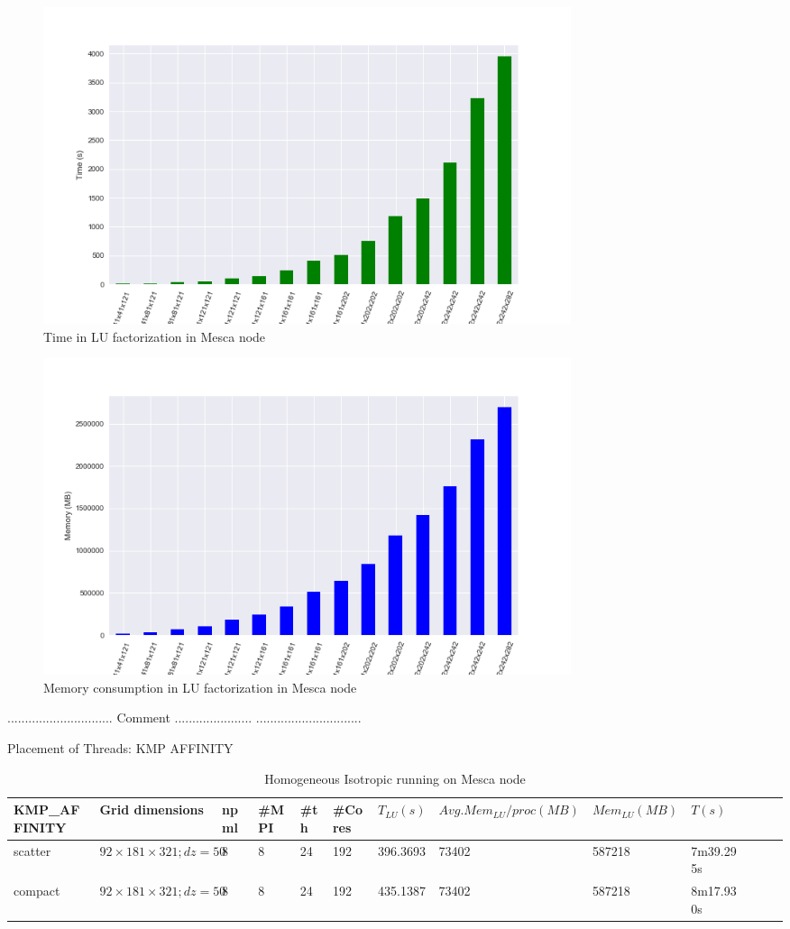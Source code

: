 \begin{figure}[]
\centering 
\includegraphics[width=0.75\textwidth]{images/Mesca_Time.png}
\caption{Time in LU factorization in Mesca node}
\label{Mesca_Time} 
\end{figure}
\begin{figure}[]
\centering 
\includegraphics[width=0.75\textwidth]{images/Mesca_Memory.png}
\caption{Memory consumption in LU factorization in Mesca node}
\label{Mesca_Memory} 
\end{figure}
.............................. \newline
Comment ......................
.............................. \newline

Placement of Threads: KMP AFFINITY

\begin{table}[!h]
\centering

\label{Mesca1}
\begin{tabular}{lllllllllllll}
KMP\_AFFINITY & Grid dimensions & npml & \#MPI & \#th & \#Cores & $T_{LU}(s)$ &$Avg. Mem_{LU}/proc(MB)$ & $Mem_{LU}(MB)$ & $T(s)$ \\
 \hline
scatter &	$92 \times 181 \times 321; dz=50$ &	8 &	8 &	24 & 192 &	396.3693 & 73402 &	587218 & 7m39.295s \\
compact &	$92 \times 181 \times 321; dz=50$ &	8 & 8 &	24 & 192 &	435.1387 & 73402 &	587218 & 8m17.930s

\end{tabular}
\caption{Homogeneous Isotropic running on Mesca node}
\end{table}


